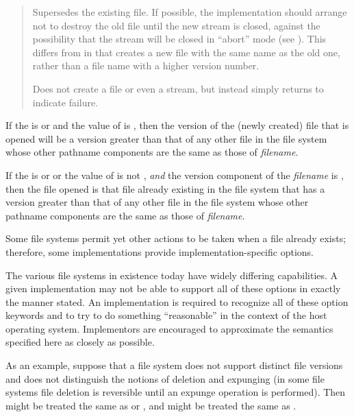\begin{defun}[Function]
\begin{flushdesc}
\begin{quotation}
\begin{flushdesc}
\item[\cd{:supersede}]
Supersedes the existing file.  If possible, the implementation should
arrange not to destroy the old file until the new stream is closed,
against the possibility that the stream will be closed in ``abort'' mode
(see ).
This differs from  in that  creates
a new file with the same name as the old one, rather than a file
name with a higher version number.

\item[\cd{\false}]
Does not create a file or even a stream, but instead
simply returns {\false} to indicate failure.
\end{flushdesc}
\end{quotation}

If the  is  or 
and the value of  is ,
then the version of the (newly created) file that is opened will
be a version greater than that of any other file in the file system
whose other pathname components are the same as those of \emph{filename}.

If the  is  or 
or the value of  is not ,
\emph{and} the version component of the \emph{filename} is ,
then the file opened is that file already existing in the file system
that has a version greater than that of any other file in the file system
whose other pathname components are the same as those of \emph{filename}.

\begin{new}
Some file systems permit yet other actions to be taken when a file
already exists; therefore,
some implementations provide implementation-specific  options.
\end{new}
\end{flushdesc}

\beforenoterule
\begin{implementation}
The various file systems in existence today
have widely differing capabilities.  A given implementation may not
be able to support all of these options in exactly the manner stated.
An implementation is required to recognize all of these option keywords
and to try to do something ``reasonable'' in the context of the host operating
system.  Implementors are encouraged to approximate the semantics specified
here as closely as possible.

As an example, suppose that a file system does not support distinct file
versions and does not distinguish the notions of deletion and expunging
(in some file systems file deletion is reversible until an expunge operation
is performed).  Then  might be treated the same as
 or , and  might
be treated the same as .


\end{implementation}
\end{defun}
